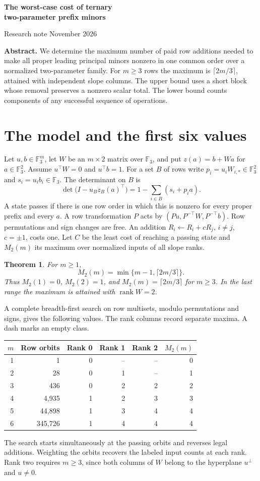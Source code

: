\documentclass[a4paper,12pt]{article}
\newcommand{\F}{\mathbb F_3}
\newtheorem{thm}{Theorem}
\begin{document}
\begin{center}
{\LARGE\bfseries The worst-case cost of ternary\\ two-parameter prefix minors\par}
\medskip Research note  November 2026
\end{center}
\noindent\textbf{Abstract.} We determine the maximum number of paid row additions needed to make all proper leading principal minors nonzero in one common order over a normalized two-parameter family. For $m\ge3$ rows the maximum is $\lceil2m/3\rceil$, attained with independent slope columns. The upper bound uses a short block whose removal preserves a nonzero scalar total. The lower bound counts components of any successful sequence of operations.

\section{The model and the first six values}
Let $u,b\in\F^m$, let $W$ be an $m\times2$ matrix over $\F$, and put $z(a)=b+Wa$ for $a\in\F^2$. Assume $u^\top W=0$ and $u^\top b=1$. For a set $B$ of rows write $p_i=u_iW_{i,*}\in\F^2$ and $s_i=u_i b_i\in\F$. The determinant on $B$ is
\[
 \det\bigl(I-u_B z_B(a)^\top\bigr)=1-\sum_{i\in B}(s_i+p_i a).
\]
A state passes if there is one row order in which this is nonzero for every proper prefix and every $a$. A row transformation $P$ acts by $(Pu,P^{-\top}W,P^{-\top}b)$. Row permutations and sign changes are free. An addition $R_i\gets R_i+cR_j$, $i\ne j$, $c=\pm1$, costs one. Let $C$ be the least cost of reaching a passing state and $M_2(m)$ its maximum over normalized inputs of all slope ranks.
\begin{thm}\label{th}
For $m\ge1$,
\[
 M_2(m)=\min\{m-1,\lceil2m/3\rceil\}.
\]
Thus $M_2(1)=0$, $M_2(2)=1$, and $M_2(m)=\lceil2m/3\rceil$ for $m\ge3$. In the last range the maximum is attained with $\operatorname{rank}W=2$.
\end{thm}
A complete breadth-first search on row multisets, modulo permutations and signs, gives the following values. The rank columns record separate maxima. A dash marks an empty class.
\begin{center}\small
\begin{tabular}{r r r r r r}\toprule
$m$ & Row orbits & Rank 0 & Rank 1 & Rank 2 & $M_2(m)$\\\midrule
1&1&0&--&--&0\\2&28&0&1&--&1\\3&436&0&2&2&2\\
4&4,935&1&2&3&3\\5&44,898&1&3&4&4\\6&345,726&1&4&4&4\\\bottomrule
\end{tabular}
\end{center}
The search starts simultaneously at the passing orbits and reverses legal additions. Weighting the orbits recovers the labeled input counts at each rank. Rank two requires $m\ge3$, since both columns of $W$ belong to the hyperplane $u^\perp$ and $u\ne0$.
\end{document}
